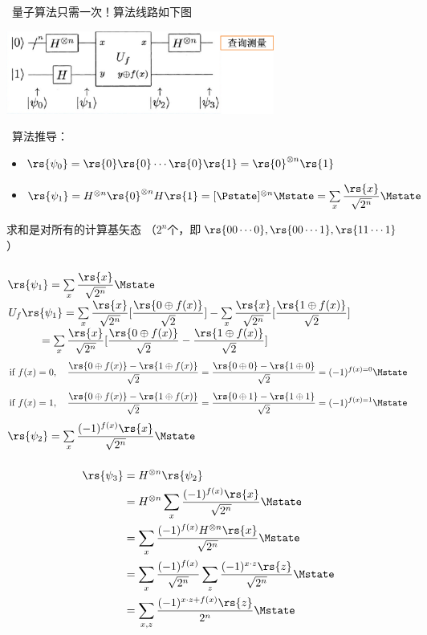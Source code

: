 \begin{frame}
    \frametitle{}
    {\Bullet}~量子算法只需一次！算法线路如下图
    \begin{center}
        \includegraphics[width=0.66\textwidth]{figs/35.png}
    \end{center}
    {\Bullet}~算法推导：
    \begin{itemize}
        \item $\rs{\psi_0}=\rs{0}\rs{0}\cdots\rs{0}\rs{1}=\rs{0}^{\otimes n}\rs{1}$
        \item $\rs{\psi_1}=H^{\otimes n}\rs{0}^{\otimes n}H\rs{1}=[\Pstate]^{\otimes n} \Mstate = \sum\limits_x \dfrac{\rs{x}}{\sqrt{2^n}} \Mstate $
    \end{itemize}
    求和是对所有的计算基矢态 （$2^n$个，即$\rs{00\cdots 0},\rs{00\cdots 1},\rs{11\cdots 1}$）
\end{frame}

\begin{frame}
    \frametitle{}
     $\rs{\psi_1}=\sum\limits_x \dfrac{\rs{x}}{\sqrt{2^n}} \Mstate$ \\
     $U_f\rs{\psi_1}=\sum\limits_x \dfrac{\rs{x}}{\sqrt{2^n}} [\dfrac{\rs{0\oplus f(x)}}{\sqrt{2}}]- \sum\limits_x \dfrac{\rs{x}}{\sqrt{2^n}}[\dfrac{\rs{1\oplus f(x)}}{\sqrt{2}}]$ \\
     $\hspace{3em}= \sum\limits_x \dfrac{\rs{x}}{\sqrt{2^n}}[\dfrac{\rs{0\oplus f(x)}}{\sqrt{2}}-\dfrac{\rs{1\oplus f(x)}}{\sqrt{2}}]$ \\
     \[\text{if} ~f(x)=0, \quad \frac{\rs{0\oplus f(x)}-\rs{1\oplus f(x)}}{\sqrt{2}}=\frac{\rs{0\oplus 0}-\rs{1\oplus 0}}{\sqrt{2}} = (-1)^{f(x)=0} \Mstate\]
     \[\text{if} ~f(x)=1, \quad \frac{\rs{0\oplus f(x)}-\rs{1\oplus f(x)}}{\sqrt{2}}=\frac{\rs{0\oplus 1}-\rs{1\oplus 1}}{\sqrt{2}} = (-1)^{f(x)=1} \Mstate\]
    $\rs{\psi_2}= \sum\limits_x \dfrac{(-1)^{f(x)}\rs{x}}{\sqrt{2^n}} \Mstate$
\end{frame}

\begin{frame}
    \frametitle{}
    \[\begin{aligned}
        \rs{\psi_3} &= H^{\otimes n }\rs{\psi_2}\\
        &= H^{\otimes n } \sum\limits_x \dfrac{(-1)^{f(x)}\rs{x}}{\sqrt{2^n}} \Mstate\\ 
        &=  \sum\limits_x \dfrac{(-1)^{f(x)}H^{\otimes n }\rs{x}}{\sqrt{2^n}} \Mstate\\ 
        &=  \sum\limits_x \dfrac{(-1)^{f(x)}}{\sqrt{2^n}} \sum\limits_z \dfrac{(-1)^{x\cdot z}\rs{z}}{\sqrt{2^n}} \Mstate\\   
        &=  \sum\limits_{x,z} \dfrac{(-1)^{x\cdot z+f(x)}\rs{z}}{2^n} \Mstate 
    \end{aligned}\]
\end{frame}


